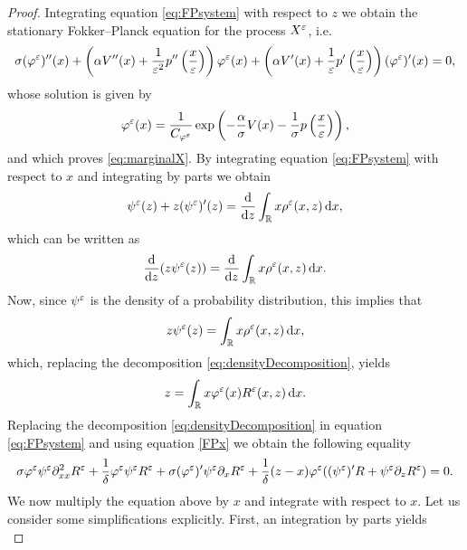 \documentclass[10pt]{article}
\begin{document}
\begin{proof} Integrating equation \eqref{eq:FPsystem} with respect to $z$ we obtain the stationary Fokker--Planck equation for the process $X^\varepsilon$, i.e.
\begin{equation}
\label{FPx}
\sigma (\varphi^\varepsilon)''(x) + \left ( \alpha V''(x) + \frac{1}{\varepsilon^2} p'' \left ( \frac{x}{\varepsilon} \right ) \right ) \varphi^\varepsilon(x) + \left ( \alpha V'(x) + \frac{1}{\varepsilon} p' \left ( \frac{x}{\varepsilon} \right ) \right ) (\varphi^\varepsilon)'(x) = 0,
\end{equation}
whose solution is given by
\begin{equation}
\varphi^\varepsilon(x) = \frac{1}{C_{\varphi^\varepsilon}} \exp\left(- \frac{\alpha}{\sigma} V(x) - \frac{1}{\sigma} p \left ( \frac{x}{\varepsilon} \right )\right),
\end{equation}
and which proves \eqref{eq:marginalX}. By integrating equation \eqref{eq:FPsystem} with respect to $x$ and integrating by parts we obtain
\begin{equation}
\psi^\varepsilon(z) + z (\psi^\varepsilon)'(z) = \frac{\mathrm{d}}{\mathrm{d} z} \int_{\mathbb{R}} x \rho^\varepsilon(x,z) \,\mathrm{d} x,
\end{equation}
which can be written as
\begin{equation}
	\frac{\mathrm{d}}{\mathrm{d} z} (z \psi^\varepsilon(z)) = \frac{\mathrm{d}}{\mathrm{d} z} \int_{\mathbb{R}} x \rho^\varepsilon(x,z) \,\mathrm{d} x.
\end{equation}
Now, since $\psi^\varepsilon$ is the density of a probability distribution, this implies that 
\begin{equation}\label{FPz}
z \psi^\varepsilon(z) = \int_{\mathbb{R}} x \rho^\varepsilon(x,z) \,\mathrm{d} x,
\end{equation}
which, replacing the decomposition \eqref{eq:densityDecomposition}, yields
\begin{equation} \label{eq:z_condition}
z = \int_{\mathbb{R}} x \varphi^\varepsilon(x) R^\varepsilon(x,z) \,\mathrm{d} x.
\end{equation}
Replacing the decomposition \eqref{eq:densityDecomposition} in equation \eqref{eq:FPsystem} and using equation \eqref{FPx} we obtain the following equality
\begin{equation}\label{eq:psiEqualityPDE}
\sigma \varphi^\varepsilon \psi^\varepsilon \partial^2_{xx} R^\varepsilon + \frac{1}{\delta} \varphi^\varepsilon \psi^\varepsilon R^\varepsilon + \sigma (\varphi^\varepsilon)' \psi^\varepsilon \partial_x R^\varepsilon + \frac{1}{\delta} (z-x) \varphi^\varepsilon ((\psi^\varepsilon)' R + \psi^\varepsilon \partial_z R^\varepsilon) = 0.
\end{equation}
We now multiply the equation above by $x$ and integrate with respect to $x$. Let us consider some simplifications explicitly. First, an integration by parts yields
\begin{equation}\label{eq:psiEqualityPDE_1}

\end{equation}
\end{proof}
\end{document}
